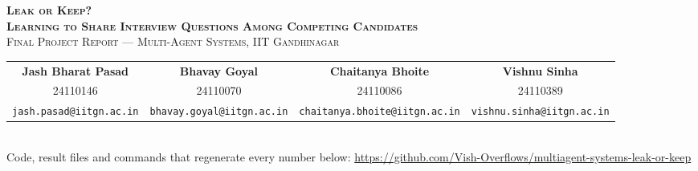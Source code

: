 \documentclass[10pt]{article}
\newcommand{\RepoURL}{https://github.com/Vish-Overflows/multiagent-systems-leak-or-keep}
\theoremstyle{plain}
\theoremstyle{definition}\newtheorem{definition}{Definition}
\begin{document}
\thispagestyle{plain}
\begin{center}
{\Large\bfseries\scshape Leak or Keep?\\[2pt] Learning to Share Interview Questions Among Competing Candidates}\\[5pt]
{\small\scshape Final Project Report --- Multi-Agent Systems, IIT Gandhinagar}\\[6pt]
{\small\setlength{\tabcolsep}{4pt}
\begin{tabular}{cccc}
\textbf{Jash Bharat Pasad} & \textbf{Bhavay Goyal} & \textbf{Chaitanya Bhoite} & \textbf{Vishnu Sinha}\\
24110146 & 24110070 & 24110086 & 24110389\\
\texttt{jash.pasad@iitgn.ac.in} & \texttt{bhavay.goyal@iitgn.ac.in} & \texttt{chaitanya.bhoite@iitgn.ac.in} & \texttt{vishnu.sinha@iitgn.ac.in}
\end{tabular}}\\[4pt]
{\small Code, result files and commands that regenerate every number below: \url{\RepoURL}}
\end{center}
\end{document}
